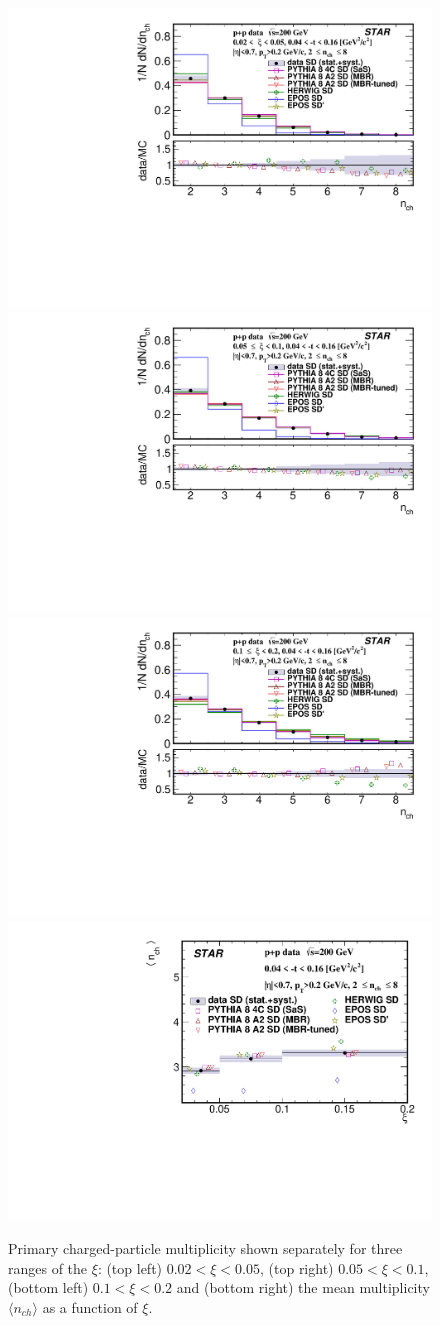 \begin{figure}[h!]
	\centering
	\includegraphics[width=.49\textwidth,page=1]{chapters/chrgSTAR/img/results/nch_ksi_0.pdf}
	\hfill
	\includegraphics[width=.49\textwidth,page=1]{chapters/chrgSTAR/img/results/nch_ksi_1.pdf}
	\newline
	\includegraphics[width=.49\textwidth,page=1]{chapters/chrgSTAR/img/results/nch_ksi_2.pdf}
	\hfill
	\includegraphics[width=.49\textwidth,page=1]{chapters/chrgSTAR/img/results/mean_nch_xi.pdf}
	\caption[Primary charged-particle multiplicity shown separately for three ranges of the $\xi$  and the mean multiplicity $\langle n_{ch}\rangle$ as a function of $\xi$.]{Primary charged-particle multiplicity shown separately for three ranges of the $\xi$: (top left) $0.02<\xi<0.05$, (top right) $0.05<\xi<0.1$, (bottom left) $0.1<\xi<0.2$ and (bottom right) the mean multiplicity $\langle n_{ch}\rangle$ as a function of $\xi$.}
	\label{fig:results_star_nch}
\end{figure}
